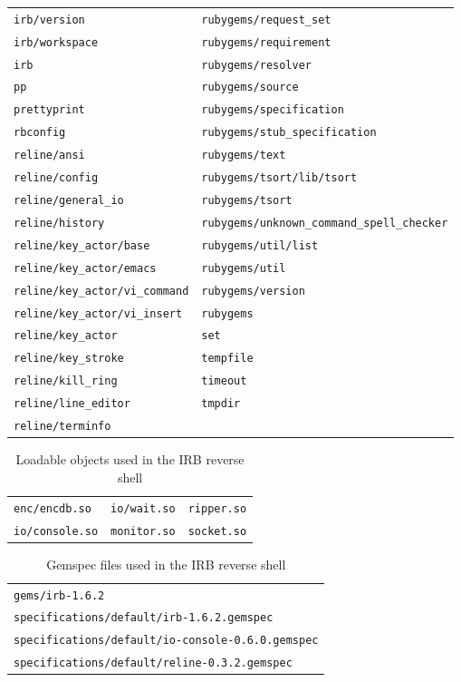 \begin{longtable}{l l}
\texttt{irb/version} & \texttt{rubygems/request\_set} \\
\texttt{irb/workspace} & \texttt{rubygems/requirement} \\
\texttt{irb} & \texttt{rubygems/resolver} \\
\texttt{pp} & \texttt{rubygems/source} \\
\texttt{prettyprint} & \texttt{rubygems/specification} \\
\texttt{rbconfig} & \texttt{rubygems/stub\_specification} \\
\texttt{reline/ansi} & \texttt{rubygems/text} \\
\texttt{reline/config} & \texttt{rubygems/tsort/lib/tsort} \\
\texttt{reline/general\_io} & \texttt{rubygems/tsort} \\
\texttt{reline/history} & \texttt{rubygems/unknown\_command\_spell\_checker} \\
\texttt{reline/key\_actor/base} & \texttt{rubygems/util/list} \\
\texttt{reline/key\_actor/emacs} & \texttt{rubygems/util} \\
\texttt{reline/key\_actor/vi\_command} & \texttt{rubygems/version} \\
\texttt{reline/key\_actor/vi\_insert} & \texttt{rubygems} \\
\texttt{reline/key\_actor} & \texttt{set} \\
\texttt{reline/key\_stroke} & \texttt{tempfile} \\
\texttt{reline/kill\_ring} & \texttt{timeout} \\
\texttt{reline/line\_editor} & \texttt{tmpdir} \\
\texttt{reline/terminfo} &  \\
\end{longtable}

\begin{longtable}{l l l}
\caption{Loadable objects used in the IRB reverse shell}\label{tab:irb-dpd-so} \\
\texttt{enc/encdb.so} & \texttt{io/wait.so} & \texttt{ripper.so} \\
\texttt{io/console.so} & \texttt{monitor.so} & \texttt{socket.so} \\
\end{longtable}

\begin{longtable}{l}
\caption{Gemspec files used in the IRB reverse shell}\label{tab:irb-dpd-gemspec} \\
\texttt{gems/irb-1.6.2} \\
\texttt{specifications/default/irb-1.6.2.gemspec} \\
\texttt{specifications/default/io-console-0.6.0.gemspec} \\ \texttt{specifications/default/reline-0.3.2.gemspec} \\
\end{longtable}


